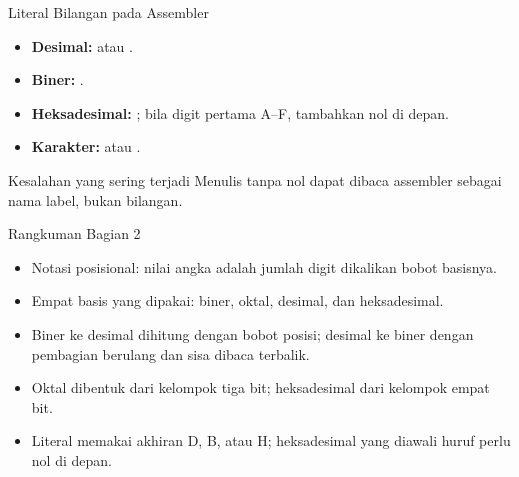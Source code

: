 \documentclass[aspectratio=169,11pt]{beamer}
\begin{document}
\begin{frame}{Literal Bilangan pada Assembler}
\small
\begin{itemize}
    \item \textbf{Desimal:}  atau .
    \item \textbf{Biner:} .
    \item \textbf{Heksadesimal:} ; bila digit pertama
          A--F, tambahkan nol di depan.
    \item \textbf{Karakter:}  atau .
\end{itemize}

\vspace{0.3em}
\begin{alertblock}{Kesalahan yang sering terjadi}
\small Menulis  tanpa nol dapat dibaca assembler sebagai
nama label, bukan bilangan.
\end{alertblock}
\end{frame}

\begin{frame}{Rangkuman Bagian 2}
\small
\begin{itemize}
    \item Notasi posisional: nilai angka adalah jumlah digit
          dikalikan bobot basisnya.

    \vspace{0.15em}
    \item Empat basis yang dipakai: biner, oktal, desimal, dan
          heksadesimal.

    \vspace{0.15em}
    \item Biner ke desimal dihitung dengan bobot posisi; desimal ke
          biner dengan pembagian berulang dan sisa dibaca terbalik.

    \vspace{0.15em}
    \item Oktal dibentuk dari kelompok tiga bit; heksadesimal dari
          kelompok empat bit.

    \vspace{0.15em}
    \item Literal memakai akhiran D, B, atau H; heksadesimal yang
          diawali huruf perlu nol di depan.
\end{itemize}
\end{frame}
\end{document}
